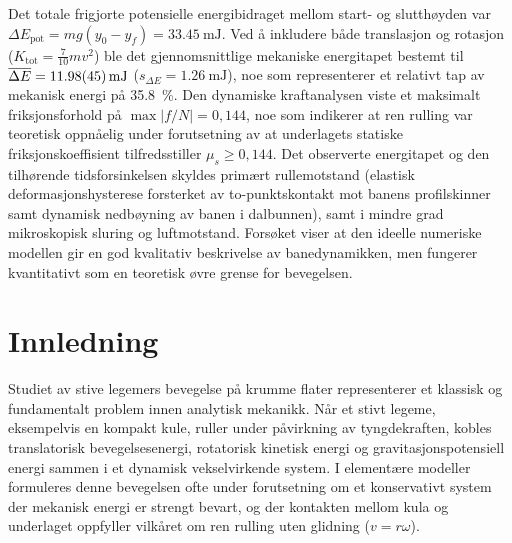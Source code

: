 \documentclass[11pt,a4paper]{article}
\begin{document}
Det totale frigjorte potensielle energibidraget mellom start- og slutthøyden var $\Delta E_{\text{pot}} = mg(y_0 - y_f) = \SI{33,45}{\milli\joule}$. Ved å inkludere både translasjon og rotasjon ($K_{\text{tot}} = \frac{7}{10}mv^2$) ble det gjennomsnittlige mekaniske energitapet bestemt til $\overline{\Delta E} = \SI{11,98 \pm 0,45}{\milli\joule}$ ($s_{\Delta E} = \SI{1,26}{\milli\joule}$), noe som representerer et relativt tap av mekanisk energi på \SI{35,8}{\percent}. Den dynamiske kraftanalysen viste et maksimalt friksjonsforhold på $\max |f/N| = 0{,}144$, noe som indikerer at ren rulling var teoretisk oppnåelig under forutsetning av at underlagets statiske friksjonskoeffisient tilfredsstiller $\mu_s \ge 0{,}144$. Det observerte energitapet og den tilhørende tidsforsinkelsen skyldes primært rullemotstand (elastisk deformasjonshysterese forsterket av to-punktskontakt mot banens profilskinner samt dynamisk nedbøyning av banen i dalbunnen), samt i mindre grad mikroskopisk sluring og luftmotstand. Forsøket viser at den ideelle numeriske modellen gir en god kvalitativ beskrivelse av banedynamikken, men fungerer kvantitativt som en teoretisk øvre grense for bevegelsen.

\vfill
\clearpage

\thispagestyle{fancy}
\vspace*{0.5cm}
\tableofcontents
\vfill
\clearpage

\section{Innledning}
Studiet av stive legemers bevegelse på krumme flater representerer et klassisk og fundamentalt problem innen analytisk mekanikk. Når et stivt legeme, eksempelvis en kompakt kule, ruller under påvirkning av tyngdekraften, kobles translatorisk bevegelsesenergi, rotatorisk kinetisk energi og gravitasjonspotensiell energi sammen i et dynamisk vekselvirkende system. I elementære modeller formuleres denne bevegelsen ofte under forutsetning om et konservativt system der mekanisk energi er strengt bevart, og der kontakten mellom kula og underlaget oppfyller vilkåret om ren rulling uten glidning ($v = r\omega$).
\end{document}
